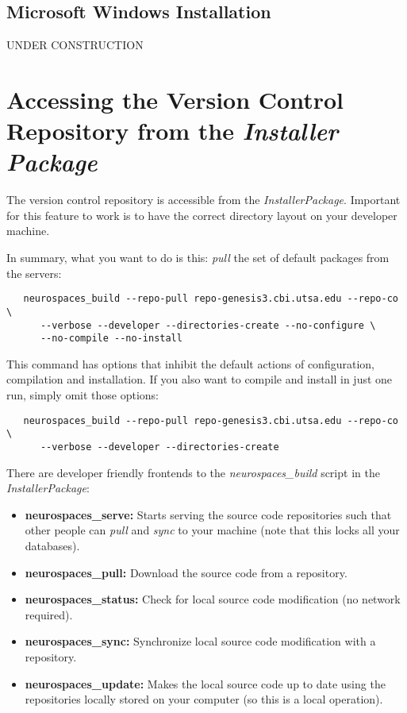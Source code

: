 \documentclass[12pt]{article}
\begin{document}
\subsection*{Microsoft Windows Installation}

UNDER CONSTRUCTION

\section*{Accessing the Version Control Repository from the {\it Installer Package}}

The version control repository is accessible from the {\it InstallerPackage}. Important for this feature to work is to have the correct directory layout on your developer machine.

In summary, what you want to do is this: {\it pull} the set of default packages from the servers:
\begin{verbatim}
   neurospaces_build --repo-pull repo-genesis3.cbi.utsa.edu --repo-co \
      --verbose --developer --directories-create --no-configure \
      --no-compile --no-install
\end{verbatim}
This command has options that inhibit the default actions of configuration, compilation and installation. If you also want to compile and install in just one run, simply omit those options:

\begin{verbatim}
   neurospaces_build --repo-pull repo-genesis3.cbi.utsa.edu --repo-co \
      --verbose --developer --directories-create
\end{verbatim}

There are developer friendly frontends to the {\it neurospaces\_build} script in the {\it InstallerPackage}:
\begin{itemize}
\item {\bf neurospaces\_serve:} Starts serving the source code repositories such that other people can {\it pull} and {\it sync} to your machine (note that this locks all your databases).
\item {\bf neurospaces\_pull:} Download the source code from a repository.
\item {\bf neurospaces\_status:} Check for local source code modification (no network required).
\item {\bf neurospaces\_sync:} Synchronize local source code modification with a repository.
\item {\bf neurospaces\_update:} Makes the local source code up to date using the repositories locally stored on your computer (so this is a local operation). 
\end{itemize}
\end{document}
